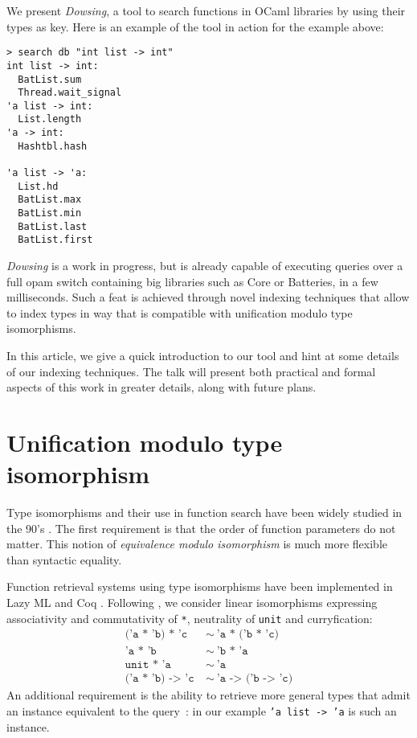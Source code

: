 \documentclass [a4paper,11pt]{scrartcl}
\newcommand{\dowsing}{\textit{Dowsing}\xspace}
\begin{document}
We present \dowsing, a tool to search functions in OCaml libraries by
using their types as key.
Here is an example of the tool in action for the example above:

\begin{lstlisting}[multicols=2]
> search db "int list -> int"
int list -> int:
  BatList.sum
  Thread.wait_signal
'a list -> int:
  List.length
'a -> int:
  Hashtbl.hash
  
'a list -> 'a:
  List.hd
  BatList.max
  BatList.min
  BatList.last
  BatList.first
\end{lstlisting}

\dowsing is a work in progress, but is already capable of
executing queries over a full opam switch
containing big libraries such as Core or Batteries, in a few milliseconds.
Such a feat is achieved through novel indexing techniques that allow
to index types in way that is compatible with unification modulo type
isomorphisms.

In this article, we give a quick introduction to our tool and hint at some
details of our indexing techniques. The talk will present both practical
and formal aspects of this work in greater details, along with
future plans.



\section{Unification modulo type isomorphism}

Type isomorphisms and their use in function search have been widely studied in the 90's \cite {rittri,dicosmo,DBLP:journals/jsyml/NarendranPS97}. The first requirement is that the order of function parameters do not matter.
This notion of \textit {equivalence modulo isomorphism} is much more flexible than syntactic equality. 

Function retrieval systems using type isomorphisms have been implemented in Lazy ML \cite{rittri} and Coq \cite{delahaye}. Following \cite{rittri}, we consider linear isomorphisms expressing associativity and commutativity of \texttt{*}, neutrality of \texttt{unit} and curryfication:
\begin{align*}
  \texttt{('a * 'b) * 'c} &\ \sim\ \texttt{'a * ('b * 'c)} \\
  \texttt{'a * 'b} &\ \sim\ \texttt{'b * 'a} \\
  \texttt{unit * 'a} &\ \sim\ \texttt{'a} \\
  \texttt{('a * 'b) -> 'c} &\ \sim\ \texttt{'a -> ('b -> 'c)}
\end{align*}
An additional requirement is the ability to retrieve more general types that admit an instance equivalent to the query~: in our example \texttt{'a list -> 'a} is such an instance. 
\end{document}
